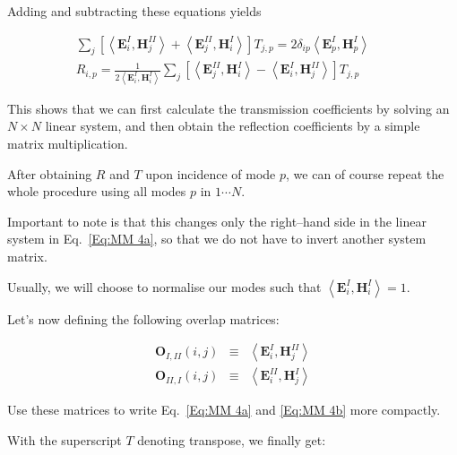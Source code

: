 Adding and subtracting these equations yields

\begin{eqnarray}
\sum _{j}\left[ \left\langle \mathbf{E}^{I}_{i},\mathbf{H}^{II}_{j}\right\rangle +\left\langle \mathbf{E}^{II}_{j},\mathbf{H}^{I}_{i}\right\rangle \right] T_{j,p}=2\delta _{ip}\left\langle \mathbf{E}^{I}_{p},\mathbf{H}^{I}_{p}\right\rangle  &  & \label{Eq:MM 4a} \\
R_{i,p}=\frac{1}{2\left\langle \mathbf{E}^{I}_{i},\mathbf{H}^{I}_{i}\right\rangle }\sum _{j}\left[ \left\langle \mathbf{E}^{II}_{j},\mathbf{H}^{I}_{i}\right\rangle -\left\langle \mathbf{E}^{I}_{i},\mathbf{H}^{II}_{j}\right\rangle \right] T_{j,p} &  & \label{Eq:MM 4b} 
\end{eqnarray}

This shows that we can first calculate the transmission coefficients by solving an $N \times N$ linear system, and then obtain the reflection coefficients by a simple matrix multiplication.

After obtaining $R$ and $T$ upon incidence of mode $p$, we can of course repeat the whole procedure using all modes $p$ in $ 1 \cdots N$.

\noindent{}Important to note is that this changes only the right--hand side in the linear system in Eq.~\ref{Eq:MM 4a}, so that we do not have to invert another system matrix. 

Usually, we will choose to normalise our modes such that \( \left\langle \mathbf{E}^{I}_{i},\mathbf{H}^{I}_{i}\right\rangle =1 \).

Let's now defining the following overlap matrices:

\begin{eqnarray}
\mathbf{O}_{I,II}\left( i,j\right)  & \equiv  & \left\langle \mathbf{E}^{I}_{i},\mathbf{H}^{II}_{j}\right\rangle \label{Eq:O_I_II} \\
\mathbf{O}_{II,I}\left( i,j\right)  & \equiv  & \left\langle \mathbf{E}^{II}_{i},\mathbf{H}^{I}_{j}\right\rangle \label{Eq:O_II_I} 
\end{eqnarray}

\begin{cue}
Use these matrices to write Eq.~\ref{Eq:MM 4a} and \ref{Eq:MM 4b} more compactly.   
\end{cue}

With the superscript $T$ denoting transpose, we finally get:


